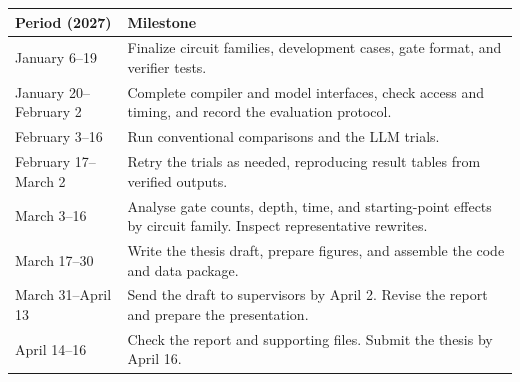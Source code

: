 \documentclass[12pt]{article}
\begin{document}
\par\smallskip
\noindent
\begin{tabularx}{\textwidth}{@{}
  >{\raggedright\arraybackslash}p{}
  >{\raggedright\arraybackslash}X
  @{}}
  \toprule
  \textbf{Period (2027)} & \textbf{Milestone} \\
  \midrule
  January 6--19 &
    Finalize circuit families, development cases, gate format, and verifier tests. \\
  \addlinespace[2pt]
  January 20--February 2 &
    Complete compiler and model interfaces, check access and timing, and record the evaluation
    protocol. \\
  \addlinespace[2pt]
  February 3--16 &
    Run conventional comparisons and the LLM trials. \\
  \addlinespace[2pt]
  February 17--March 2 &
    Retry the trials as needed, reproducing result tables from verified outputs. \\
  \addlinespace[2pt]
  March 3--16 &
    Analyse gate counts, depth, time, and starting-point effects by circuit family. Inspect
    representative rewrites. \\
  \addlinespace[2pt]
  March 17--30 &
    Write the thesis draft, prepare figures, and assemble the code and data package. \\
  \addlinespace[2pt]
  March 31--April 13 &
    Send the draft to supervisors by April 2. Revise the report and prepare the presentation. \\
  \addlinespace[2pt]
  April 14--16 &
    Check the report and supporting files. Submit the thesis by April 16. \\
  \bottomrule
\end{tabularx}
\par\smallskip

\thesisreferences
\end{document}
